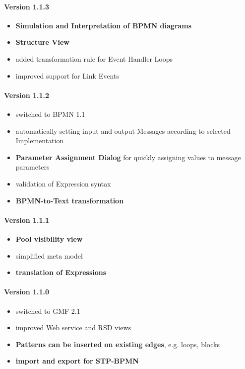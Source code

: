 \paragraph{Version 1.1.3}
\begin{itemize}
	\item \textbf{Simulation and Interpretation of BPMN diagrams}
	\item \textbf{Structure View}
	\item added transformation rule for Event Handler Loops
	\item improved support for Link Events
\end{itemize}

\paragraph{Version 1.1.2}
\begin{itemize}
	\item switched to BPMN 1.1
	\item automatically setting input and output Messages according to selected Implementation
	\item \textbf{Parameter Assignment Dialog} for quickly assigning values to message parameters
	\item validation of Expression syntax
	\item \textbf{BPMN-to-Text transformation}
\end{itemize}

\paragraph{Version 1.1.1}
\begin{itemize}
	\item \textbf{Pool visibility view}
	\item simplified meta model
	\item \textbf{translation of Expressions}
\end{itemize}

\paragraph{Version 1.1.0}
\begin{itemize}
	\item switched to GMF 2.1
	\item improved Web service and RSD views
	\item \textbf{Patterns can be inserted on existing edges}, e.g. loops, blocks
	\item \textbf{import and export for STP-BPMN}
\end{itemize}


